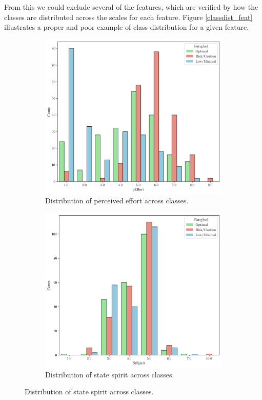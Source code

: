 \documentclass[conference]{IEEEtran}
\begin{document}
From this we could exclude several of the features, which are verified by how the classes are distributed across the scales for each feature. Figure \ref{classdist_feat} illustrates a proper and poor example of class distribution for a given feature.

\begin{figure}[H]
    \centering
    \begin{subfigure}[1]{\linewidth}
        \centering
        \includegraphics[width=\linewidth]{assets/distribution_pEffort.png}
        \caption{Distribution of perceived effort across classes.}
        \label{fig:subfig-a}
    \end{subfigure}
    
    \vspace{0.5cm}

    \begin{subfigure}[2]{\linewidth}
        \centering
        \includegraphics[width=\linewidth]{assets/distribution_StSpirit.png}
        \caption{Distribution of state spirit across classes.}
        \label{fig:subfig-b}
    \end{subfigure}
    

\end{figure}
\end{document}
